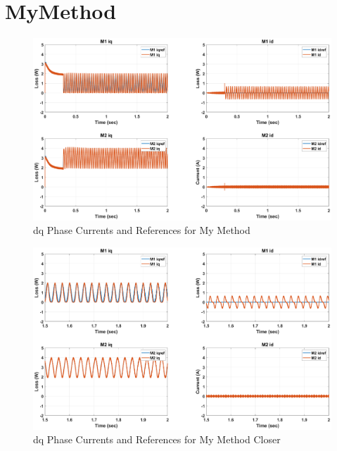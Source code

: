 \documentclass{article}
\begin{document}
\section{MyMethod}
\begin{figure}[H]
\centering
\includegraphics[scale=0.35]{SimulationResults/MyMethod/idq_refs.eps}
\caption{dq Phase Currents and References for My Method}
\label{fig:PhaseCurrentsReferencesMyMethod}
\end{figure}

\begin{figure}[H]
\centering
\includegraphics[scale=0.35]{SimulationResults/MyMethod/idq_refs_closer.eps}
\caption{dq Phase Currents and References for My Method Closer}
\label{fig:PhaseCurrentsReferencesMyMethodCloser}
\end{figure}
\end{document}
